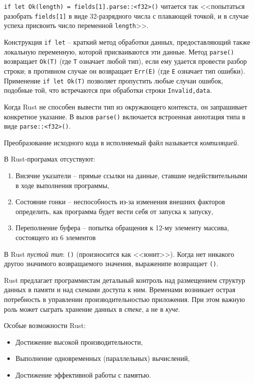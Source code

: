 \documentclass[%
	11pt,
	a4paper,
	utf8,
		]{article}
\begin{document}
\verb|if let Ok(length) = fields[1].parse::<f32>()| читается так <<попытаться разобрать \texttt{fields[1]} в виде 32-разрядного числа с плавающей точкой, и в случае успеха присвоить число переменной \verb|length|>>.

Конструкция \verb|if let| -- краткий метод обработки данных, предоставляющий также локальную переменную, которой присваиваются эти данные. Метод \verb|parse()| возвращает \texttt{Ok(T)} (где \verb|T| означает любой тип), если ему удается провести разбор строки; в противном случае он возвращает \texttt{Err(E)} (где \texttt{E} означает тип ошибки). Применение \verb|if let Ok(T)| позволяет пропустить любые случаи ошибок, подобные той, что встречаются при обработки строки \texttt{Invalid,data}.

Когда Rust не способен вывести тип из окружающего контекста, он запрашивает конкретное указание. В вызов \verb|parse()| включается встроенная аннотация типа в виде \verb|parse::<f32>()|.

Преобразование исходного кода в исполняемый файл называется \emph{компиляцией}.

В Rust-програмах отсуствуют:
\begin{enumerate}
	\item Висячие указатели -- прямые ссылки на данные, ставшие недействительными в ходе выполнения программы,
	
	\item Состояние гонки -- неспособность из-за изменения внешних факторов определить, как программа будет вести себя от запуска к запуску,
	
	\item Переполнение буфера -- попытка обращения к 12-му элементу массива, состоящего из 6 элементов
\end{enumerate}

В Rust \emph{пустой тип}: \texttt{()} (произносится как <<юнит>>). Когда нет никакого другоо значимого возвращаемого значения, выраженипе возвращает \texttt{()}.

Rust предлагает программистам детальный контроль над размещением структур данных в памяти и над схемами доступа к ним. Временами возникает острая потребность в управлении производительностью приложения. При этом важную роль может сыграть хранение данных в \emph{стеке}, а не в \emph{куче}. 
  
Особые возможности Rust:
\begin{itemize}
	\item Достижение высокой производительности,
	
	\item Выполнение одновременных (параллельных) вычислений,
	
	\item Достижение эффективной работы с памятью.
\end{itemize}
\end{document}
